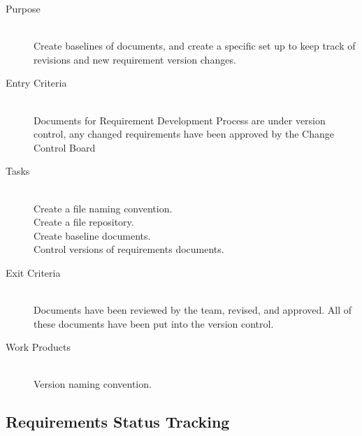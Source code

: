 \documentclass[11pt]{article}
\begin{document}
\begin{description}

\item[Purpose] \hfill \\
Create baselines of documents, and create a specific set up to keep track of revisions and new requirement version changes.


\item[Entry Criteria]\hfill \\
Documents for Requirement Development Process are under version control, any changed requirements have been approved by the Change Control Board


\item[Tasks]\hfill \\
Create a file naming convention.\\
Create a file repository.\\
Create baseline documents.\\
Control versions of requirements documents.\\


\item[Exit Criteria]\hfill \\
Documents have been reviewed by the team, revised, and approved. All of these documents have been put into the version control.
  

\item[Work Products]\hfill \\
Version naming convention.
\\


\end{description}

\subsection{Requirements Status Tracking}
\end{document}
